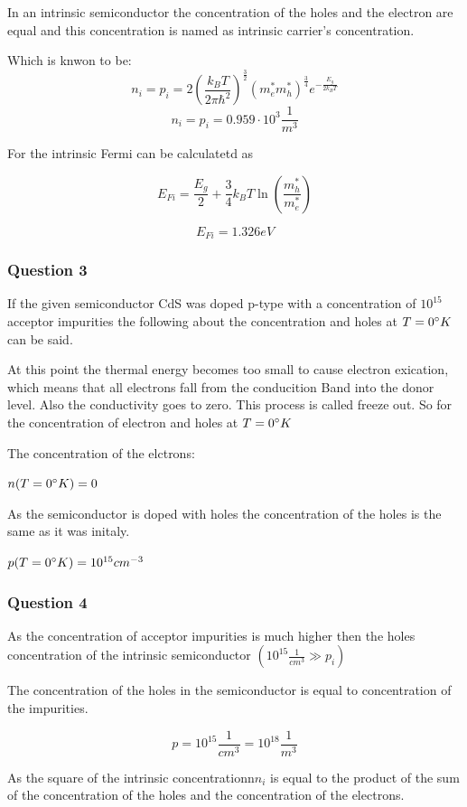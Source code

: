 In an intrinsic semiconductor the concentration of the holes and the 
electron are equal and this concentration is named as
intrinsic carrier's concentration. 

Which is knwon to be:
$$n_i = p_i = 2 \left( \frac{k_BT}{2\pi\hbar^2} \right)^{\frac{3}{2}}
  (m_e^*m_h^*)^{\frac{3}{4}} e^{-\frac{E_g}{2k_BT}}$$
$$n_i = p_i = 0.959 \cdot 10^3 \frac{1}{m^3}$$

For the intrinsic Fermi can be calculatetd as 

$$E_{Fi} = \frac{E_g}{2} + \frac{3}{4} k_B T \ln\left( \frac{m_h^*}{m_e^*} \right)$$

$$E_{Fi} = 1.326 eV$$


\subsubsection*{Question 3}

If the given semiconductor CdS was doped p-type with a
concentration of $10^{15}$ acceptor impurities the following
about the concentration and holes at $T=0\degree K$ can be said.

At this point the thermal energy becomes too small to cause electron exication, which means that all electrons fall from
the conducition Band into the donor level. Also the conductivity
goes to zero. This process is called freeze out. 
So for the concentration of electron and holes at $T=0 \degree K$

The concentration of the elctrons:

$n(T=0 \degree K) = 0$

As the semiconductor is doped with holes the concentration of the
holes is the same as it was initaly.

$p(T=0 \degree K) = 10^{15}cm^{-3}$


\subsubsection*{Question 4}

As the concentration of acceptor impurities is much higher then
the holes concentration of the intrinsic semiconductor 
$(10^{15} \frac{1}{cm^3} \gg p_i)$

The concentration of the holes in the semiconductor is equal to concentration
of the impurities.

$$p = 10^{15} \frac{1}{cm^3} = 10^{18} \frac{1}{m^3}$$

As the square of the intrinsic concentrationn$n_i$ is equal to the product
of the sum of the concentration of the holes and the concentration of the
electrons.

